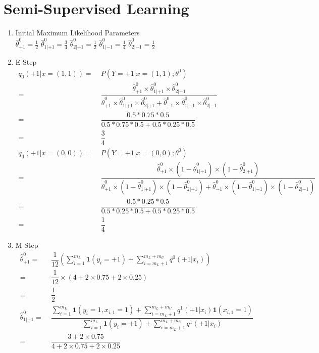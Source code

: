 \documentclass[english]{article}
\begin{document}
\section{Semi-Supervised Learning}
\begin{enumerate}
    \item Initial Maximum Likelihood Parameters\\
    $\hat{\theta}_{+1}^0 = \frac{1}{2}$ \quad $\hat{\theta}_{1|+1}^0 = \frac{3}{4}$ \quad $\hat{\theta}_{2|+1}^0 = \frac{1}{2}$ \quad $\hat{\theta}_{1|-1}^0 = \frac{1}{4}$ \quad $\hat{\theta}_{2|-1}^0 = \frac{1}{2}$
    \item E Step
    \begin{align*}
    q_0(+1|x = (1,1)) = &\; P(Y = +1|x = (1,1);\theta^0)\\
    = &\; \dfrac{\hat{\theta}_{+1}^0 \times \hat{\theta}_{1|+1}^0 \times \hat{\theta}_{2|+1}^0}{\hat{\theta}_{+1}^0 \times \hat{\theta}_{1|+1}^0 \times \hat{\theta}_{2|+1}^0 + \hat{\theta}_{-1}^0 \times \hat{\theta}_{1|-1}^0 \times \hat{\theta}_{2|-1}^0}\\
    = &\; \dfrac{0.5*0.75*0.5}{0.5*0.75*0.5+0.5*0.25*0.5}\\
    = &\; \dfrac{3}{4}\\
    q_0(+1|x = (0,0)) = &\; P(Y = +1|x = (0,0);\theta^0)\\
    = &\; \dfrac{\hat{\theta}_{+1}^0 \times (1-\hat{\theta}_{1|+1}^0) \times (1-\hat{\theta}_{2|+1}^0)}{\hat{\theta}_{+1}^0 \times (1-\hat{\theta}_{1|+1}^0) \times (1-\hat{\theta}_{2|+1}^0) + \hat{\theta}_{-1}^0 \times (1-\hat{\theta}_{1|-1}^0) \times (1-\hat{\theta}_{2|-1}^0)}\\
    = &\; \dfrac{0.5*0.25*0.5}{0.5*0.25*0.5 + 0.5*0.25*0.5}\\
    = &\; \dfrac{1}{4}
    \end{align*}
    \item M Step
    \begin{align*}
    \hat{\theta}_{+1}^0 = &\; \dfrac{1}{12}(\sum_{i=1}^{m_L} \mathbf{1}(y_i = +1) +\sum_{i=m_L+1}^{m_L+m_U} q^0(+1|x_i))\\
    = &\; \dfrac{1}{12} \times (4+2 \times 0.75 + 2 \times 0.25)\\
    = &\; \dfrac{1}{2}\\
    \hat{\theta}_{1|+1}^0 = &\; \dfrac{\sum_{i=1}^{m_L}\mathbf{1}(y_i=1, x_{i,1}=1) + \sum_{i = m_L+1}^{m_L+m_U}q^1(+1|x_i)\mathbf{1}(x_{i,1}=1)}{\sum_{i=1}^{m_L}\mathbf{1}(y_i=+1)+\sum_{i = m_L+1}^{m_L+m_U}q^1(+1|x_i)}\\
    = &\; \dfrac{3 + 2 \times 0.75}{4 + 2 \times 0.75 + 2 \times 0.25}\\

\end{align*}
\end{enumerate}
\end{document}
